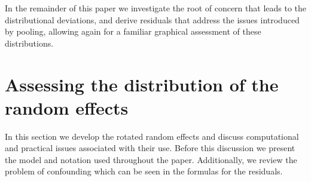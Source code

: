 \documentclass[12pt]{article} %
\newcommand{\hh}[1]{{\color{orange} #1}}
\begin{document}


In the remainder of this paper we investigate the root of concern that leads to the distributional deviations, and derive residuals that address the issues introduced by pooling, allowing again for a familiar graphical assessment of these distributions.

\section{Assessing the distribution of the random effects}\label{sec:}

In this section we develop the rotated random effects and discuss computational and practical issues associated with their use. Before this discussion we present the model and notation used throughout the paper. Additionally, we review the problem of confounding which can be seen in the formulas for the residuals.

\end{document}
